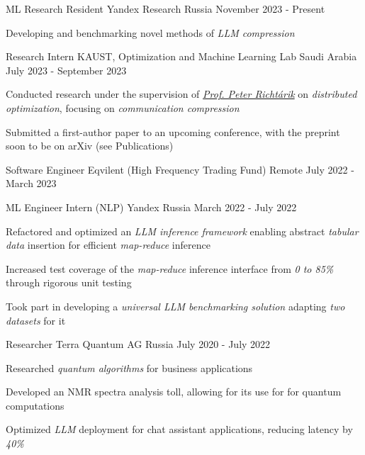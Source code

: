 
\begin{cventries}
  \cventry
    {ML Research Resident}
    {Yandex Research}
    {Russia}
    {November 2023 - Present}
    {
      \begin{cvitems}
        \item {Developing and benchmarking novel methods of \textit{LLM compression}}
      \end{cvitems}
    }

  \cventry
    {Research Intern}
    {KAUST, Optimization and Machine Learning Lab}
    {Saudi Arabia}
    {July 2023 - September 2023}
    {
      \begin{cvitems}
        \item {Conducted research under the supervision of  \href{https://richtarik.org/}{\textit{Prof. Peter Richtárik}} on \textit{distributed optimization}, focusing on \textit{communication compression}}
        \item {Submitted a first-author paper to an upcoming conference, with the preprint soon to be on arXiv (see Publications)}
      \end{cvitems}
    }

  \cventry
    {Software Engineer}
    {Eqvilent (High Frequency Trading Fund)}
    {Remote}
    {July 2022 - March 2023}
    {}

  \cventry
    {ML Engineer Intern (NLP)}
    {Yandex}
    {Russia}
    {March 2022 - July 2022}
    {
      \begin{cvitems} %
        \item {Refactored and optimized an \textit{LLM inference framework} enabling abstract \textit{tabular data} insertion for efficient \textit{map-reduce} inference}
        \item {Increased test coverage of the \textit{map-reduce} inference interface from \textit{0 to 85\%} through rigorous unit testing}
        \item {Took part in developing a \textit{universal LLM benchmarking solution} adapting \textit{two datasets} for it}
      \end{cvitems}
    }
    
  \cventry
    {Researcher} %
    {Terra Quantum AG} %
    {Russia} %
    {July 2020 - July 2022} %
    {
      \begin{cvitems} %
        \item { Researched \textit{quantum algorithms} for business applications }
        \item { Developed an {NMR spectra} analysis toll, allowing for its use for  for quantum computations }
        \item { Optimized \textit{LLM} deployment for chat assistant applications, reducing latency by \textit{40\%} }
      \end{cvitems}
    }
    
\end{cventries}
